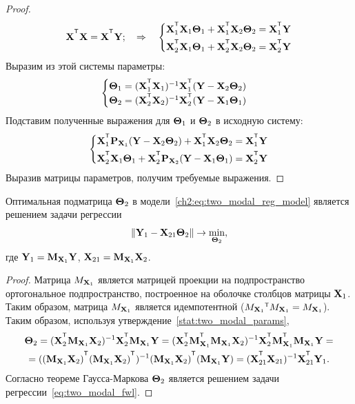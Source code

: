 \begin{proof}
	\[
		\bX^{\T} \bX = \bX^{\T} \bY; \quad \Rightarrow \quad
		\begin{cases*}
			\bX_1^{\T} \bX_1 \bTheta_1 + \bX_1^{\T} \bX_2 \bTheta_2 = \bX_1^{\T} \bY \\
			\bX_2^{\T} \bX_1 \bTheta_1 + \bX_2^{\T} \bX_2 \bTheta_2 = \bX_2^{\T} \bY 
		\end{cases*}
	\]
	Выразим из этой системы параметры:
	\[
		\begin{cases}
			\bTheta_1 = (\bX_1^{\T} \bX_1)^{-1} \bX_1^{\T} (\bY - \bX_2 \bTheta_2) \\
			\bTheta_2 = (\bX_2^{\T} \bX_2 )^{-1}  \bX_2^{\T} (\bY - \bX_1 \bTheta_1)
		\end{cases}
	\]
	Подставим полученные выражения для $\boldsymbol{\Theta}_1$ и $\boldsymbol{\Theta}_2$ в исходную систему:
	\[
				\begin{cases*}
					\bX_1^{\T} \bP_{\bX_1} (\bY - \bX_2 \bTheta_2) + \bX_1^{\T} \bX_2 \bTheta_2 = \bX_1^{\T} \bY \\
					\bX_2^{\T} \bX_1 \bTheta_1 + \bX_2^{\T}\bP_{\bX_2} (\bY - \bX_1 \bTheta_1) = \bX_2^{\T} \bY 
				\end{cases*}
	\]
	Выразив матрицы параметров, получим требуемые выражения.
\end{proof}

\begin{statement}
	\label{stat:two_modal_theta2}
	Оптимальная подматрица $\boldsymbol{\Theta}_2$ в модели~\eqref{ch2:eq:two_modal_reg_model} является решением задачи регрессии
	\begin{equation}
		\| \mathbf{Y}_1 -  \mathbf{X}_{21} \boldsymbol{\Theta}_2 \| \rightarrow \min_{\boldsymbol{\Theta}_2},
		\label{eq:two_modal_fwl}
	\end{equation}
	где $\mathbf{Y}_1 = \mathbf{M}_{\mathbf{X}_1} \mathbf{Y}$, $\mathbf{X}_{21} = \mathbf{M}_{\mathbf{X}_1} \mathbf{X}_2$.
\end{statement}

\begin{proof}
	Матрица $M_{\mathbf{X}_1}$ является матрицей проекции на подпространство ортогональное подпространство, построенное на оболочке столбцов матрицы $\mathbf{X}_1$. Таким образом, матрица $M_{\mathbf{X}_1}$ является идемпотентной ($M_{\bX_1}{\T} M_{\bX_1} = M_{\bX_1}$). 
	Таким образом, используя утверждение~\autoref{stat:two_modal_params},
	\begin{multline*}
		\bTheta_2 = (\bX_2^{\T} \bM_{\bX_1} \bX_2)^{-1} \bX_2^{\T} \bM_{\bX_1} \bY = (\bX_2^{\T} \bM_{\bX_1}^{\T} \bM_{\bX_1} \bX_2)^{-1} \bX_2^{\T} \bM_{\bX_1}^{\T} \bM_{\bX_1} \bY = \\
		= ((\bM_{\bX_1} \bX_2)^{\T} (\bM_{\bX_1} \bX_2)^{\T})^{-1} (\bM_{\bX_1} \bX_2)^{\T} (\bM_{\bX_1} \bY) = (\bX_{21}^{\T} \bX_{21})^{-1} \bX_{21}^{\T} \bY_1.
	\end{multline*}
	Согласно теореме Гаусса-Маркова $\boldsymbol{\Theta}_2$ является решением задачи регрессии~\eqref{eq:two_modal_fwl}.
\end{proof}

